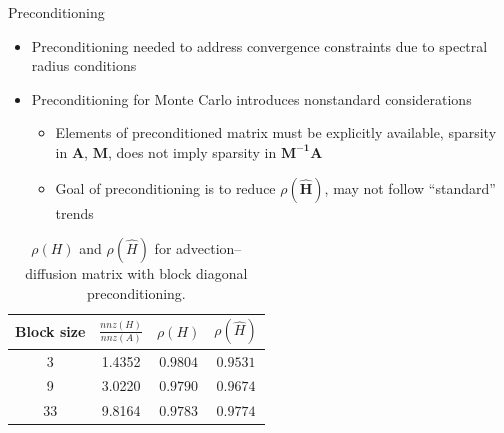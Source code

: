 \documentclass{beamer}
\begin{document}

\begin{frame}{Preconditioning}
  \begin{itemize}
    \item Preconditioning needed to address convergence constraints due to
      spectral radius conditions
    \item Preconditioning for Monte Carlo introduces nonstandard considerations
      \begin{itemize}
      \item Elements of preconditioned matrix must be explicitly available,
        sparsity in $\mathbf{A}$, $\mathbf{M}$, does not imply sparsity in
        $\mathbf{M^{-1}A}$
        \item Goal of preconditioning is to reduce $\rho(\hat{\mathbf{H}})$,
          may not follow ``standard'' trends
      \end{itemize}
  \end{itemize}
  \vfill

  \begin{table}[!h]
  \centering
  \begin{tabular}{|c|c|c|c|}
  \hline
  \textbf{Block size} & \textbf{$\frac{nnz(H)}{nnz(A)}$}& $\rho(H)$
  &$\rho(\hat{H})$\\
  \hline
   3 & 1.4352 & $0.9804$ & $0.9531$\\
  \hline
   9 & 3.0220 & $0.9790$ & $0.9674$\\
  \hline
   33 & 9.8164 & $0.9783$  & $0.9774$\\
  \hline
  \end{tabular}
  \caption{$\rho(H)$ and $\rho(\hat{H})$ for advection--diffusion
  matrix with block diagonal preconditioning.}
  \label{tab:ifiss_block}
  \end{table}
\end{frame}

\end{document}
